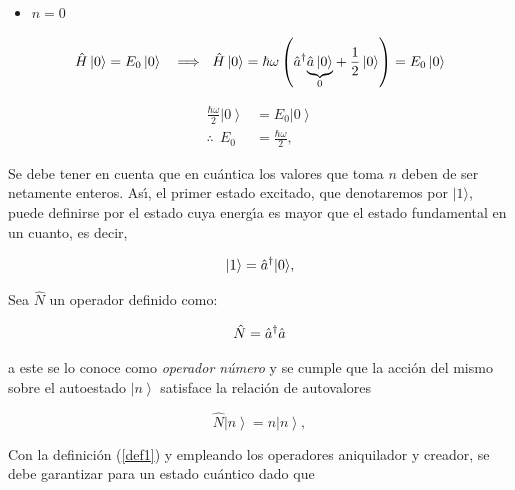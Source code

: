 \begin{itemize}
    \item $n=0$ 
\end{itemize}

\begin{equation*}
\hat{H} \left\vert 0\right\rangle =E_{0}\left\vert 0\right\rangle ~\ \implies ~ \hat{H}\left\vert 0\right\rangle =\hbar \omega \left( \hat{a}^{\dagger }\underset{0}{\underbrace{ \hat{a} \left\vert 0\right\rangle }}+\frac{1}{2}\left\vert
0\right\rangle \right) =E_{0}\left\vert 0\right\rangle
\end{equation*}


\begin{equation} \label{1.14}
\begin{split}
\frac{\hbar \omega }{2}\left\vert 0\right\rangle & = E_{0}\left\vert 0\right\rangle \\    
\therefore ~~ E_{0} &= \frac{\hbar \omega }{2},
\end{split}    
\end{equation}

Se debe tener en cuenta que en cu\'{a}ntica los valores que toma $n$ deben de ser netamente enteros. As\'{\i}, el primer estado excitado, que
denotaremos por $|1\rangle $, puede definirse por el estado cuya energ\'{\i}a es mayor que el estado fundamental en un cuanto, es decir,

\begin{equation}
|1\rangle =\hat{a}^{\dagger }|0\rangle  \label{1.15},
\end{equation}

\newcommand{\OoN}{\hat{N}}

\begin{definition}

Sea $\OoN$ un operador definido como:

\begin{equation*}
\OoN=\Oaa^{\dagger} \Oaa
\end{equation*}

a este se lo conoce como \emph{operador n\'{u}mero }y se cumple que la acci\'{o}n del mismo sobre el autoestado $\left\vert n\right\rangle $ satisface la relaci\'{o}n de autovalores

\begin{equation}
\OoN \left\vert n\right\rangle =n\left\vert n\right\rangle, 
\label{1.16}
\end{equation}
\label{def1}
\end{definition}


Con la definici\'{o}n (\ref{def1}) y empleando los operadores aniquilador y creador, se debe garantizar para un estado cu\'{a}ntico dado que

